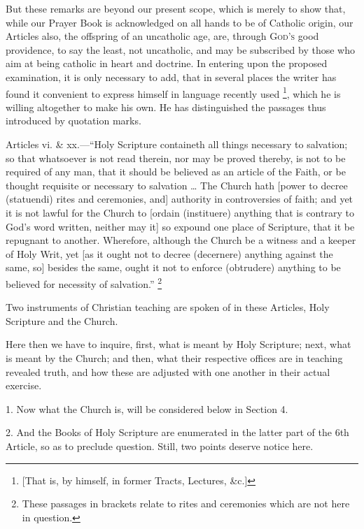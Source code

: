 But these remarks are beyond our present scope, which is merely to
show that, while our Prayer Book is acknowledged on all hands to be of
Catholic origin, our Articles also, the offspring of an uncatholic
age, are, through G\textsc{od's} good providence,
to say the least, not uncatholic, and may be subscribed by those who
aim at being catholic in heart and doctrine. In entering upon the
proposed examination, it is only necessary to add, that in several
places the writer has found it convenient to express himself in
language recently used \footnote{[That is, by himself, in former Tracts,
Lectures, \&c.]},
which he is willing altogether to make his own. He has distinguished
the passages thus introduced by quotation marks.


Articles vi. \& xx.—``Holy Scripture containeth all things
necessary to salvation; so that whatsoever is not read therein, nor
may be proved thereby, is not to be required of any man, that it
should be believed as an article of the Faith, or be thought requisite
or necessary to salvation … The Church hath [power to decree (statuendi)
rites and ceremonies, and] authority in controversies of faith; and
yet it is not lawful for the Church to [ordain (instituere) anything
that is contrary to God's word written, neither may it] so expound one
place of Scripture, that it be repugnant to another. Wherefore,
although the Church be a witness and a keeper of Holy Writ, yet [as it
ought not to decree (decernere) anything against the same, so] besides
the same, ought it not to enforce (obtrudere) anything to be believed
for necessity of salvation.'' \footnote{These passages in brackets relate to rites
and ceremonies which are not here in question.}

Two instruments of Christian teaching are spoken of in these
Articles, Holy Scripture and the Church.

Here then we have to inquire, first, what is meant by Holy
Scripture; next, what is meant by the Church; and then, what their
respective offices are in teaching revealed truth, and how these are
adjusted with one another in their actual exercise.

1. Now what the Church is, will be considered below in Section 4.

2. And the Books of Holy Scripture are enumerated in the latter
part of the 6th Article, so as to preclude question. Still, two points
deserve notice here.

